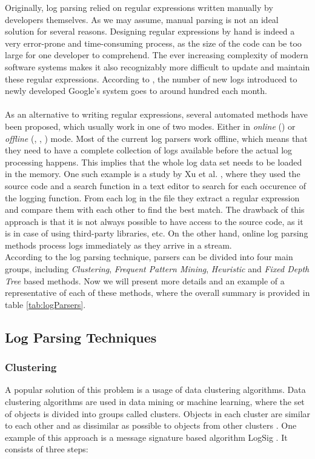 Originally, log parsing relied on regular expressions written manually by developers themselves. As we may assume, manual parsing is not an ideal solution for several reasons. Designing regular expressions by hand is indeed a very error-prone and time-consuming process, as the size of the code can be too large for one developer to comprehend. The ever increasing complexity of modern software systems makes it also recognizably more difficult to update and maintain these regular expressions. According to \cite{xu2009}, the number of new logs introduced to newly developed Google's system goes to around hundred each month. \\
\\
As an alternative to writing regular expressions, several automated methods have been proposed, which usually work in one of two modes. Either in \textit{online} (\cite{drain2017}) or \textit{offline} (\cite{vaarandi2003}, \cite{logsig2011}, \cite{Makanju2009ALA}) mode. Most of the current log parsers work offline, which means that they need to have a complete collection of logs available before the actual log processing happens. This implies that the whole log data set needs to be loaded in the memory. One such example is a study by Xu et al. \cite{xu2008}, where they used the source code and a search function in a text editor to search for each occurence of the logging function. From each log in the file they extract a regular expression and compare them with each other to find the best match. The drawback of this approach is that it is not always possible to have access to the source code, as it is in case of using third-party libraries, etc. On the other hand, online log parsing methods process logs immediately as they arrive in a stream. \\
According to the log parsing technique, parsers can be divided into four main groups, including \textit{Clustering}, \textit{Frequent Pattern Mining}, \textit{Heuristic} and \textit{Fixed Depth Tree} based methods. Now we will present more details and an example of a representative of each of these methods, where the overall summary is provided in table \ref{tab:logParsers}.  \\

\subsection{Log Parsing Techniques}
    
    \subsubsection*{Clustering} 
    A popular solution of this problem is a usage of data clustering algorithms. Data clustering algorithms are used in data mining or machine learning, where the set of objects is divided into groups called clusters. Objects in each cluster are similar to each other and as dissimilar as possible to objects from other clusters \cite{vaarandi2003}. One example of this approach is a message signature based algorithm LogSig \cite{logsig2011}. It consists of three steps: 
    
